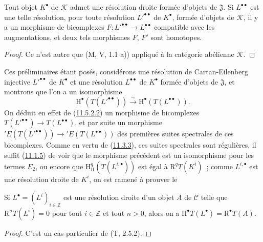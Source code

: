 \begin{corollary}[11.5.2.2]
\label{0.11.5.2.2-fr}
Tout objet $K^\bullet$ de $\mathcal K$ admet une résolution droite formée
d'objets de $\mathfrak J$. Si $L^{\bullet\bullet}$ est une telle résolution,
pour toute résolution $L'^{\bullet\bullet}$ de $K^\bullet$, formée d'objets
de $\mathcal K$, il y a un morphisme de bicomplexes
$F:L'^{\bullet\bullet}\to L^{\bullet\bullet}$ compatible avec les
augmentations, et deux tels morphismes $F$, $F'$ sont homotopes.
\end{corollary}

\begin{proof}
Ce n'est autre que (M, V, 1.1 a)) appliqué à la catégorie abélienne
$\mathcal K$.
\end{proof}

\begin{env}[11.5.2.3]
\label{0.11.5.2.3-fr}
Ces préliminaires étant posés, considérons une résolution de
Cartan-Eilenberg injective $L'^{\bullet\bullet}$ de $K^\bullet$ et une
résolution $L^{\bullet\bullet}$ de $K^\bullet$ formée d'objets de
$\mathfrak J$, et montrons que l'on a un isomorphisme
\[
  \mathrm H^\bullet(T(L'^{\bullet\bullet}))\xrightarrow{\sim}
  \mathrm H^\bullet(T(L^{\bullet\bullet})).
\]
On déduit en effet de (\hyperref[0.11.5.2.2-fr]{11.5.2.2}) un morphisme de
bicomplexes $T(L'^{\bullet\bullet})\to T(L^{\bullet\bullet})$, et par suite
un morphisme
$'E(T(L'^{\bullet\bullet}))\to{}'E(T(L^{\bullet\bullet}))$ des premières
suites spectrales de ces bicomplexes. Comme en vertu de
(\hyperref[0.11.3.3-fr]{11.3.3}), ces suites spectrales sont régulières, il
suffit (\hyperref[0.11.1.5-fr]{11.1.5}) de voir que le morphisme précédent est
un isomorphisme pour les termes $E_2$, ou encore que
$\mathrm H_{\mathrm{II}}^q(T(L^{i,\bullet}))$ est égal à
$\mathrm R^qT(K^i)$~; comme $L^{i,\bullet}$ est une résolution droite de
$K^i$, on est ramené à prouver le
\end{env}

\begin{lemma}[11.5.2.4]
\label{0.11.5.2.4-fr}
Si $L^\bullet=(L^i)_{i\in\mathbb Z}$ est une résolution droite d'un objet $A$
de $\mathcal C$ telle que $\mathrm R^nT(L^i)=0$ pour tout $i\in\mathbb Z$ et
tout $n>0$, alors on a
$\mathrm H^\bullet T(L^\bullet)=\mathrm R^\bullet T(A)$.
\end{lemma}

\begin{proof}
C'est un cas particulier de (T, 2.5.2).
\end{proof}

